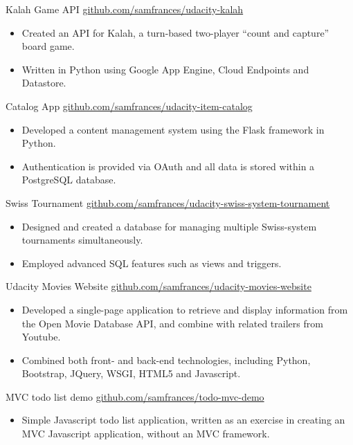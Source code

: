 \documentclass[10pt,a4paper,sans]{moderncv} %
\begin{document}
    { Kalah Game API}{}{}
    {\href{ http://www.github.com/samfrances/udacity-kalah }{ github.com/samfrances/udacity-kalah }}
    {        \begin{itemize}
            \item{Created an API for Kalah, a turn-based two-player “count and capture” board game.}
            \item{Written in Python using Google App Engine, Cloud Endpoints and Datastore.}
        \end{itemize}
}
    { Catalog App}{}{}
    {\href{ http://github.com/samfrances/udacity-item-catalog }{ github.com/samfrances/udacity-item-catalog }}
    {        \begin{itemize}
            \item{Developed a content management system using the Flask framework in Python.}
            \item{Authentication is provided via OAuth and all data is stored within a PostgreSQL database.}
        \end{itemize}
}
    { Swiss Tournament}{}{}
    {\href{ http://www.github.com/samfrances/udacity-swiss-system-tournament }{ github.com/samfrances/udacity-swiss-system-tournament }}
    {        \begin{itemize}
            \item{Designed and created a database for managing multiple Swiss-system tournaments simultaneously.}
            \item{Employed advanced SQL features such as views and triggers.}
        \end{itemize}
}
    { Udacity Movies Website}{}{}
    {\href{ http://www.github.com/samfrances/udacity-movies-website }{ github.com/samfrances/udacity-movies-website }}
    {        \begin{itemize}
            \item{Developed a single-page application to retrieve and display information from the Open Movie Database API, and combine with related trailers from Youtube.}
            \item{Combined both front- and back-end technologies, including Python, Bootstrap, JQuery, WSGI, HTML5 and Javascript.}
        \end{itemize}
}
    { MVC todo list demo}{}{}
    {\href{ http://www.github.com/samfrances/todo-mvc-demo }{ github.com/samfrances/todo-mvc-demo }}
    {        \begin{itemize}
            \item{Simple Javascript todo list application, written as an exercise in creating an MVC Javascript application, without an MVC framework.}
        \end{itemize}
}
\end{document}
